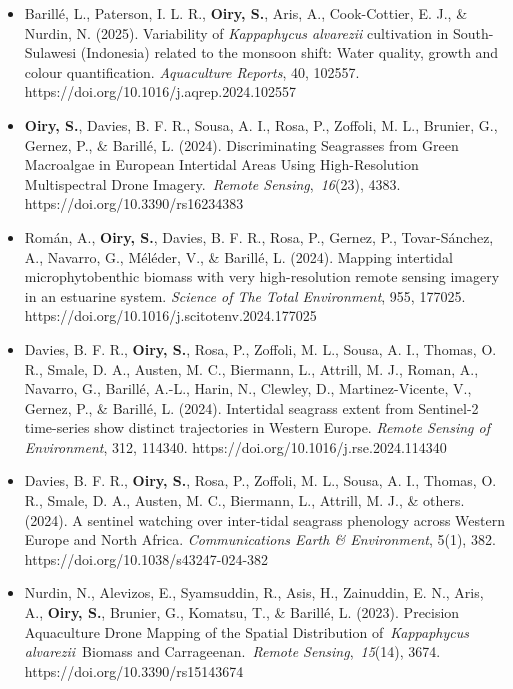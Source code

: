 \documentclass[
  letterpaper,
  11pt,
  english,
  singlespacing,
  headsepline]{MastersDoctoralThesis}
\begin{document}
\begin{itemize}
\item
  Barillé, L., Paterson, I. L. R., \textbf{Oiry, S.}, Aris, A.,
  Cook-Cottier, E. J., \& Nurdin, N. (2025). Variability of
  \emph{Kappaphycus alvarezii} cultivation in South-Sulawesi (Indonesia)
  related to the monsoon shift: Water quality, growth and colour
  quantification. \emph{Aquaculture Reports}, 40, 102557.
  https://doi.org/10.1016/j.aqrep.2024.102557
\item
  \textbf{Oiry, S.}, Davies, B. F. R., Sousa, A. I., Rosa, P., Zoffoli,
  M. L., Brunier, G., Gernez, P., \& Barillé, L. (2024). Discriminating
  Seagrasses from Green Macroalgae in European Intertidal Areas Using
  High-Resolution Multispectral Drone Imagery.~\emph{Remote
  Sensing},~\emph{16}(23), 4383. https://doi.org/10.3390/rs16234383
\item
  Román, A., \textbf{Oiry, S.}, Davies, B. F. R., Rosa, P., Gernez, P.,
  Tovar-Sánchez, A., Navarro, G., Méléder, V., \& Barillé, L. (2024).
  Mapping intertidal microphytobenthic biomass with very high-resolution
  remote sensing imagery in an estuarine system. \emph{Science of The
  Total Environment}, 955, 177025.
  https://doi.org/10.1016/j.scitotenv.2024.177025
\item
  Davies, B. F. R., \textbf{Oiry, S.}, Rosa, P., Zoffoli, M. L., Sousa,
  A. I., Thomas, O. R., Smale, D. A., Austen, M. C., Biermann, L.,
  Attrill, M. J., Roman, A., Navarro, G., Barillé, A.-L., Harin, N.,
  Clewley, D., Martinez-Vicente, V., Gernez, P., \& Barillé, L. (2024).
  Intertidal seagrass extent from Sentinel-2 time-series show distinct
  trajectories in Western Europe. \emph{Remote Sensing of Environment},
  312, 114340. https://doi.org/10.1016/j.rse.2024.114340
\item
  Davies, B. F. R., \textbf{Oiry, S.}, Rosa, P., Zoffoli, M. L., Sousa,
  A. I., Thomas, O. R., Smale, D. A., Austen, M. C., Biermann, L.,
  Attrill, M. J., \& others. (2024). A sentinel watching over
  inter-tidal seagrass phenology across Western Europe and North Africa.
  \emph{Communications Earth \& Environment}, 5(1), 382.
  https://doi.org/10.1038/s43247-024-382
\item
  Nurdin, N., Alevizos, E., Syamsuddin, R., Asis, H., Zainuddin, E. N.,
  Aris, A., \textbf{Oiry, S.}, Brunier, G., Komatsu, T., \& Barillé, L.
  (2023). Precision Aquaculture Drone Mapping of the Spatial
  Distribution of~\emph{Kappaphycus alvarezii}~Biomass and
  Carrageenan.~\emph{Remote Sensing},~\emph{15}(14), 3674.
  https://doi.org/10.3390/rs15143674

\end{itemize}
\end{document}
